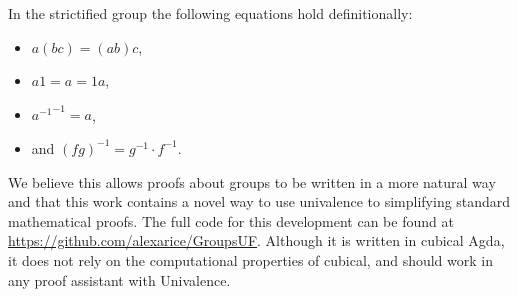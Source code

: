 \documentclass{article}
\begin{document}
In the strictified group the following equations hold definitionally:
\begin{itemize}
\item \(a  (b c) = (a b) c\),
\item \(a 1 = a = 1 a\),
\item \({a^{-1}}^{-1} = a\),
\item and \((f g)^{-1} = g^{-1} \cdot f^{-1}\).
\end{itemize}
We believe this allows proofs about groups to be written in a more natural way and that this work contains a novel way to use univalence to simplifying standard mathematical proofs. The full code for this development can be found at \url{https://github.com/alexarice/GroupsUF}. Although it is written in cubical Agda, it does not rely on the computational properties of cubical, and should work in any proof assistant with Univalence.
\end{document}
